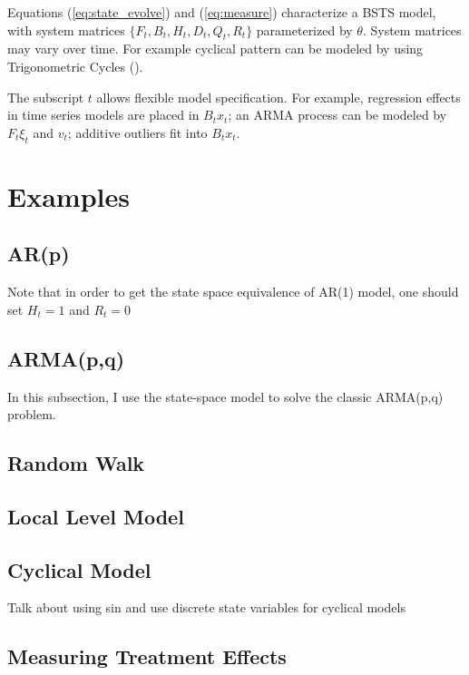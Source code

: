 \documentclass[10pt, titlepage]{article}
\numberwithin{equation}{section}
\begin{document}
Equations (\ref{eq:state_evolve}) and (\ref{eq:measure}) characterize a BSTS model, with system matrices $\{F_t, B_t, H_t, D_t, Q_t, R_t\}$ parameterized by $\theta$. System matrices may vary over time. For example cyclical pattern can be modeled by using Trigonometric Cycles (\cite{harvey_1985}). 

The subscript $t$ allows flexible model specification. For example, regression effects in time series models are placed in $B_t x_t$; an ARMA process can be modeled by $F_t\xi_t$ and $v_t$; additive outliers fit into $B_t x_t$.

\section{Examples} \label{sec:apply}
\subsection{AR(p)}
Note that in order to get the state space equivalence of AR(1) model, one should set $H_t=1$ and $R_t=0$

\subsection{ARMA(p,q)}
In this subsection, I use the state-space model to solve the classic ARMA(p,q) problem. 

\subsection{Random Walk}

\subsection{Local Level Model}

\subsection{Cyclical Model}
Talk about using sin and use discrete state variables for cyclical models

\subsection{Measuring Treatment Effects}
\end{document}
